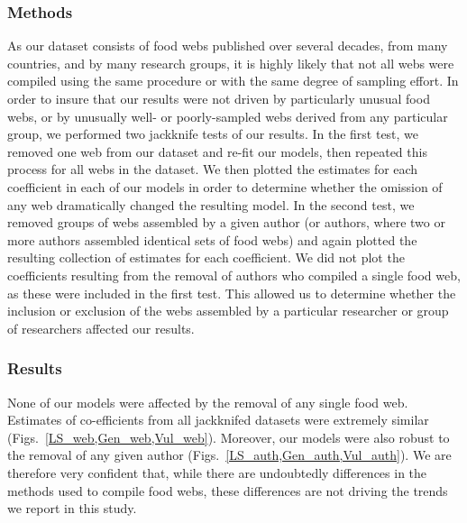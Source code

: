 \documentclass[12pt]{article}
\begin{document}
  \subsubsection*{Methods}
    As our dataset consists of food webs published over several decades, from 
    many countries, and by many research groups, it is highly likely that not
    all webs were compiled using the same procedure or with the same degree of
    sampling effort. In order to insure that our results were not driven by
    particularly unusual food webs, or by unusually well- or poorly-sampled webs 
    derived from any particular group, we performed two jackknife tests of our 
    results. In the first test, we removed one web from our dataset and re-fit 
    our models, then repeated this process for all webs in the dataset. We then 
    plotted the estimates for each coefficient in each of our models in order to 
    determine whether the omission of any web dramatically changed the resulting 
    model. In the second test, we removed groups of webs assembled by a given 
    author (or authors, where two or more authors assembled identical sets of 
    food webs) and again plotted the resulting collection of estimates for each
    coefficient. We did not plot the coefficients resulting from the removal of
    authors who compiled a single food web, as these were included in the first
    test. This allowed us to determine whether the inclusion or exclusion
    of the webs assembled by a particular researcher or group of researchers
    affected our results.

  \subsubsection*{Results}

    None of our models were affected by the removal of any single food web.
    Estimates of co-efficients from all jackknifed datasets were extremely
    similar (Figs.~\ref{LS_web,Gen_web,Vul_web}). Moreover, our models were also robust to the removal
    of any given author (Figs.~\ref{LS_auth,Gen_auth,Vul_auth}). We are therefore very confident that,
    while there are undoubtedly differences in the methods used to compile food webs,
    these differences are not driving the trends we report in this study.
\end{document}

